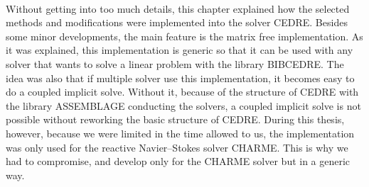   \paragraph{}
  Without getting into too much details, this chapter explained how the selected methods and modifications were implemented into the solver CEDRE.
  Besides some minor developments, the main feature is the matrix free implementation.
  As it was explained, this implementation is generic so that it can be used with any solver that wants to solve a linear problem with the library BIBCEDRE.
  The idea was also that if multiple solver use this implementation, it becomes easy to do a coupled implicit solve.
  Without it, because of the structure of CEDRE with the library ASSEMBLAGE conducting the solvers, a coupled implicit solve is not possible without reworking the basic structure of CEDRE.
  During this thesis, however, because we were limited in the time allowed to us, the implementation was only used for the reactive Navier--Stokes solver CHARME.
  This is why we had to compromise, and develop only for the CHARME solver but in a generic way.
